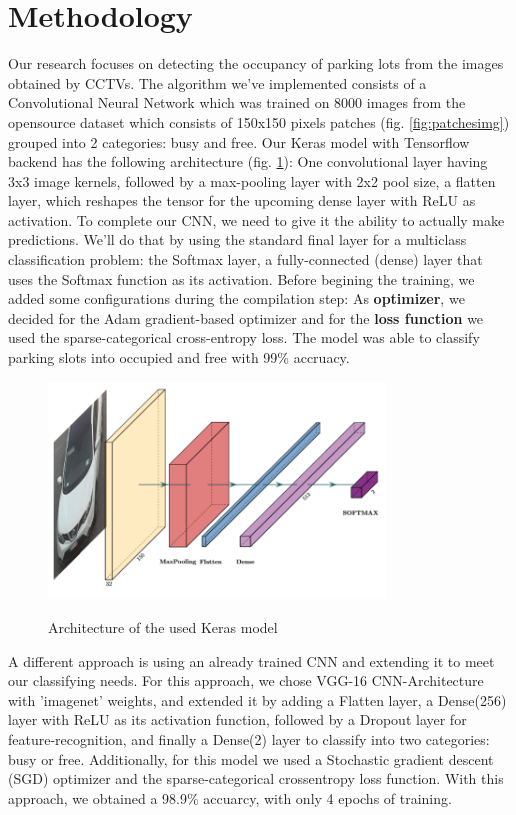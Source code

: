 \documentclass[12pt]{article}
\begin{document}
\section{Methodology}
Our research focuses on detecting the occupancy of parking lots from the images obtained by CCTVs.
The algorithm we've implemented consists of a Convolutional Neural Network which was trained on 8000 images from the opensource 
\cite{cnrpark} dataset which consists of 150x150 pixels patches (fig. \ref{fig:patchesimg}) grouped into 2 categories: busy and free.
Our Keras model with Tensorflow backend has the following architecture (fig. \ref{fig:architectureimg}): One convolutional layer having 3x3 image kernels,
followed by a max-pooling layer with 2x2 pool size, a flatten layer, which reshapes the tensor for the upcoming dense layer 
with ReLU as activation. To complete our CNN, we need to give it the ability to actually make predictions. 
We’ll do that by using the standard final layer for a multiclass classification problem: 
the Softmax layer, a fully-connected (dense) layer that uses the Softmax function as its activation.
Before begining the training, we added some configurations during the compilation step:
As \textbf{optimizer}, we decided for the Adam gradient-based optimizer and for the \textbf{loss function} 
we used the sparse-categorical cross-entropy loss. The model was able to classify parking slots into occupied and free with 99\% accruacy.

\begin{figure}
\caption{Architecture of the used Keras model}
\includegraphics[width=0.8\textwidth]{Architecture}
\label{fig:architectureimg}
\end{figure}

\par
A different approach is using an already trained CNN and extending it to meet our classifying needs.
For this approach, we chose VGG-16 CNN-Architecture with 'imagenet' weights, and extended it by adding a Flatten layer, a Dense(256) layer with ReLU as its activation
function, followed by a Dropout layer for feature-recognition, and finally a Dense(2) layer to classify into two categories: busy or free.
Additionally, for this model we used a Stochastic gradient descent (SGD) optimizer and the sparse-categorical crossentropy loss function.
With this approach, we obtained a 98.9\% accuarcy, with only 4 epochs of training.
\end{document}
